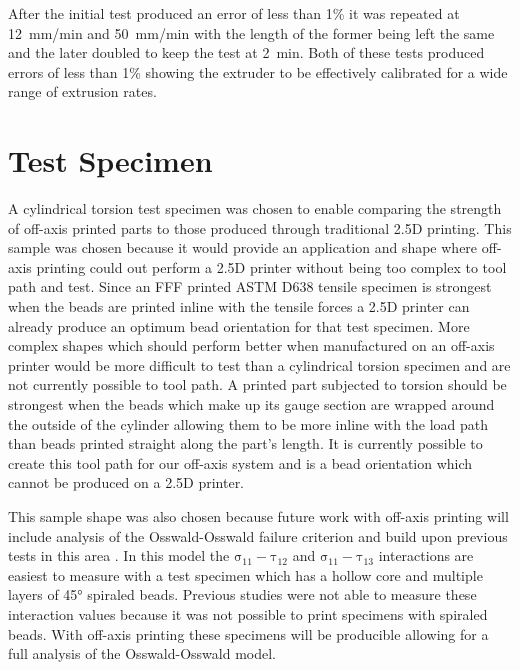 \documentclass[main.tex]{subfiles}
\begin{document}
After the initial test produced an error of less than 1\% it was repeated at \SI{12}{mm/min} and \SI{50}{mm/min} with the length of the former being left the same and the later doubled to keep the test at \SI{2}{min}.
Both of these tests produced errors of less than 1\% showing the extruder to be effectively calibrated for a wide range of extrusion rates.

\section{Test Specimen}
A cylindrical torsion test specimen was chosen to enable comparing the strength of off-axis printed parts to those produced through traditional 2.5D printing.
This sample was chosen because it would provide an application and shape where off-axis printing could out perform a 2.5D printer without being too complex to tool path and test.
Since an FFF printed ASTM D638 tensile specimen is strongest when the beads are printed inline with the tensile forces a 2.5D printer can already produce an optimum bead orientation for that test specimen.
More complex shapes which should perform better when manufactured on an off-axis printer would be more difficult to test than a cylindrical torsion specimen and are not currently possible to tool path.
A printed part subjected to torsion should be strongest when the beads which make up its gauge section are wrapped around the outside of the cylinder allowing them to be more inline with the load path than beads printed straight along the part's length.
It is currently possible to create this tool path for our off-axis system and is a bead orientation which cannot be produced on a 2.5D printer.

This sample shape was also chosen because future work with off-axis printing will include analysis of the Osswald-Osswald failure criterion and build upon previous tests in this area \cite{Obst2017}.
In this model the $\operatorname{\sigma_{11}-\tau_{12}}$ and $\operatorname{\sigma_{11}-\tau_{13}}$ interactions are easiest to measure with a test specimen which has a hollow core and multiple layers of \ang{45} spiraled beads.
Previous studies were not able to measure these interaction values because it was not possible to print specimens with spiraled beads.
With off-axis printing these specimens will be producible allowing for a full analysis of the Osswald-Osswald model.
\end{document}
